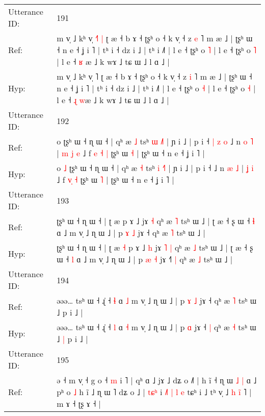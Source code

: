 \documentclass[10pt]{article}
\DeclareRobustCommand{\hl}[1]{{\textcolor{red}{#1}}}
\begin{document}
\begin{longtable}{ll}
 \\
\midrule
Utterance ID: & 191 \\
Ref: & m v̩ ˩ kʰ v̩ \hl{˧}˥\hl{ }\hl{|} ʈ æ ˧ b ɤ ˧ ʈʂʰ o ˧ k v̩ ˧ z \hl{e} ˥ m æ ˩ | ʈʂʰ ɯ ˧ n e ˧ ʝ i ˥ | tʰ i ˧ dz i ˩ | tʰ i ˩˥ | l e ˧ ʈʂʰ o \hl{˥} | l e ˧ ʈʂʰ o \hl{˥} | l e ˧ \hl{ʁ} \hl{}æ ˩ k wɤ ˩ tɕ ɯ ˩ l ɑ ˩ |
 \\
Hyp: & m v̩ ˩ kʰ v̩ \hl{}˥\hl{}\hl{} ʈ æ ˧ b ɤ ˧ ʈʂʰ o ˧ k v̩ ˧ z \hl{i} ˥ m æ ˩ | ʈʂʰ ɯ ˧ n e ˧ ʝ i ˥ | tʰ i ˧ dz i ˩ | tʰ i ˩˥ | l e ˧ ʈʂʰ o \hl{˧} | l e ˧ ʈʂʰ o \hl{˧} | l e ˧ \hl{ɻ} \hl{w}æ ˩ k wɤ ˩ tɕ ɯ ˩ l ɑ ˩ |
 \\
\midrule
Utterance ID: & 192 \\
Ref: & o\hl{}\hl{} ʈʂʰ ɯ ˧ ɳ ɯ ˧ | qʰ æ \hl{˩} tsʰ \hl{ɯ} \hl{˩}˥ | ɲ i ˩ | p i ˧\hl{ }\hl{|}\hl{ }\hl{z}\hl{ }\hl{o} ˩ n \hl{o} \hl{˥} |\hl{ }\hl{m} \hl{j} \hl{e} ˩ f \hl{e}\hl{ }\hl{˧} \hl{|} ʈʂʰ ɯ \hl{˧} | ʈʂʰ ɯ ˧ n e ˧ ʝ i ˥ |
 \\
Hyp: & o\hl{ }\hl{˩} ʈʂʰ ɯ ˧ ɳ ɯ ˧ | qʰ æ \hl{˧} tsʰ \hl{i} \hl{˧}˥ | ɲ i ˩ | p i ˧\hl{}\hl{}\hl{}\hl{}\hl{}\hl{} ˩ n \hl{æ} \hl{˩} |\hl{}\hl{} \hl{ʝ} \hl{i} ˩ f \hl{}\hl{v}\hl{̩} \hl{˧} ʈʂʰ ɯ \hl{˥} | ʈʂʰ ɯ ˧ n e ˧ ʝ i ˥ |
 \\
\midrule
Utterance ID: & 193 \\
Ref: & ʈʂʰ ɯ ˧ ɳ ɯ ˧ | ʈ æ\hl{}\hl{} p ɤ ˩\hl{}\hl{} jɤ\hl{}\hl{} \hl{˧} qʰ æ \hl{˥} tsʰ ɯ ˩ | ʈ æ ˧ ʂ ɯ ˧ \hl{ɬ} ɑ ˩ m v̩ ˩ ɳ ɯ ˩ | p \hl{ɤ} \hl{˩} jɤ ˧\hl{}\hl{}\hl{} qʰ æ \hl{˥} tsʰ ɯ ˩ |
 \\
Hyp: & ʈʂʰ ɯ ˧ ɳ ɯ ˧ | ʈ æ\hl{ }\hl{˧} p ɤ ˩\hl{ }\hl{h} jɤ\hl{ }\hl{˥} \hl{|} qʰ æ \hl{˩} tsʰ ɯ ˩ | ʈ æ ˧ ʂ ɯ ˧ \hl{l} ɑ ˩ m v̩ ˩ ɳ ɯ ˩ | p \hl{æ} \hl{˧} jɤ ˧\hl{˥}\hl{ }\hl{|} qʰ æ \hl{˩} tsʰ ɯ ˩ |
 \\
\midrule
Utterance ID: & 194 \\
Ref: & əəə… tsʰ ɯ ˧ ɻ̍ ˧ \hl{ɬ} ɑ \hl{˩} m v̩ ˩ ɳ ɯ ˩ | p\hl{ }\hl{ɤ} \hl{˩} jɤ ˧\hl{}\hl{} qʰ æ \hl{˥} tsʰ ɯ ˩\hl{}\hl{} p i ˩ |
 \\
Hyp: & əəə… tsʰ ɯ ˧ ɻ̍ ˧ \hl{l} ɑ \hl{˧} m v̩ ˩ ɳ ɯ ˩ | p\hl{}\hl{} \hl{ɑ} jɤ ˧\hl{ }\hl{|} qʰ æ \hl{˧} tsʰ ɯ ˩\hl{ }\hl{|} p i ˩ |
 \\
\midrule
Utterance ID: & 195 \\
Ref: & ə ˧ m v̩ ˧ g o ˧ \hl{m} i ˥ | qʰ ɑ ˩ jɤ ˩ dʑ o ˩˥ | h ĩ ˧ ɳ ɯ\hl{ }\hl{˩}\hl{ }\hl{|} ɑ ˩ pʰ o \hl{˩} h ĩ ˩ ɳ ɯ \hl{}˥\hl{}\hl{} dʑ o ˩ | \hl{t}\hl{ɕ}\hl{ʰ} i \hl{˩}\hl{˥} \hl{|} \hl{l} \hl{e} tɕʰ i ˩ tʰ v̩ ˩\hl{ }\hl{h} \hl{i}\hl{̃}\hl{ }˥ | m ɤ ˧ ʈʂ ɤ ˧ |
 \\

\end{longtable}
\end{document}
